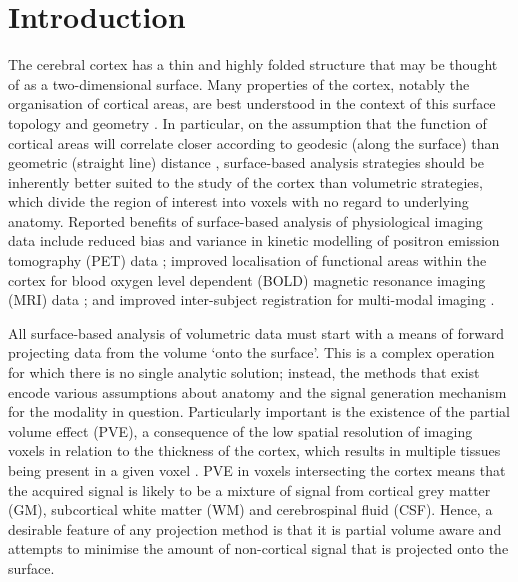\documentclass[review]{elsarticle}
\begin{document}
\linenumbers

\section{Introduction}

The cerebral cortex has a thin and highly folded structure that may be thought of as a two-dimensional surface. Many properties of the cortex, notably the organisation of cortical areas, are best understood in the context of this surface topology and geometry \cite{Dale1999}. In particular, on the assumption that the function of cortical areas will correlate closer according to geodesic (along the surface) than geometric (straight line) distance \cite{Frost2012}, surface-based analysis strategies should be inherently better suited to the study of the cortex than volumetric strategies, which divide the region of interest into voxels with no regard to underlying anatomy. Reported benefits of surface-based analysis of physiological imaging data include reduced bias and variance in kinetic modelling of positron emission tomography (PET) data \cite{Greve2014}; improved localisation of functional areas within the cortex for blood oxygen level dependent (BOLD) magnetic resonance imaging (MRI) data \cite{Tucholka2012, Glasser2016a}; and improved inter-subject registration for multi-modal imaging \cite{Glasser2016a, Coalson2017}. 

All surface-based analysis of volumetric data must start with a means of forward projecting data from the volume `onto the surface'. This is a complex operation for which there is no single analytic solution; instead, the methods that exist encode various assumptions about anatomy and the signal generation mechanism for the modality in question. Particularly important is the existence of the partial volume effect (PVE), a consequence of the low spatial resolution of imaging voxels in relation to the thickness of the cortex, which results in multiple tissues being present in a given voxel \cite{Fischl1999a, Zhao2017a}. PVE in voxels intersecting the cortex means that the acquired signal is likely to be a mixture of signal from cortical grey matter (GM), subcortical white matter (WM) and cerebrospinal fluid (CSF). Hence, a desirable feature of any projection method is that it is partial volume aware and attempts to minimise the amount of non-cortical signal that is projected onto the surface. 
\end{document}
